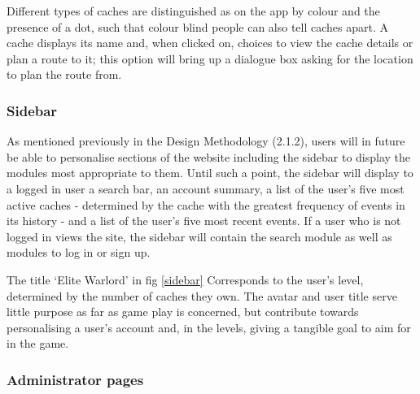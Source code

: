 Different types of caches are distinguished as on the app by colour and the presence of a dot, such that colour blind people can also tell caches apart. A cache displays its name and, when clicked on, choices to view the cache details or plan a route to it; this option will bring up a dialogue box asking for the location to plan the route from.

\subsubsection{Sidebar}

As mentioned previously in the Design Methodology (2.1.2), users will in future be able to personalise sections of the website including the sidebar to display the modules most appropriate to them. Until such a point, the sidebar will display to a logged in user a search bar, an account summary, a list of the user's five most active caches - determined by the cache with the greatest frequency of events in its history - and a list of the user's five most recent events. If a user who is not logged in views the site, the sidebar will contain the search module as well as modules to log in or sign up.

The title `Elite Warlord' in fig \ref{sidebar} Corresponds to the user's level, determined by the number of caches they own. The avatar and user title serve little purpose as far as game play is concerned, but contribute towards personalising a user's account and, in the levels, giving a tangible goal to aim for in the game.

\subsubsection{Administrator pages}

